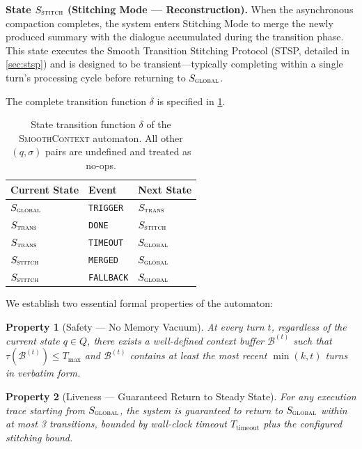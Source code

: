 \documentclass[10pt,twocolumn]{article}
\newtheorem{property}{Property}
\newcommand{\sys}{\textsc{SmoothContext}}
\newcommand{\Dtok}{\tau}
\newcommand{\Tmax}{T_{\max}}
\begin{document}
\textbf{State $S_{\textsc{stitch}}$ (Stitching Mode --- Reconstruction).} When the asynchronous compaction completes, the system enters Stitching Mode to merge the newly produced summary with the dialogue accumulated during the transition phase. This state executes the Smooth Transition Stitching Protocol (STSP, detailed in \cref{sec:stsp}) and is designed to be transient---typically completing within a single turn's processing cycle before returning to $S_{\textsc{global}}$.

The complete transition function $\delta$ is specified in \cref{tab:transitions}.

\begin{table}[h]
\centering
\caption{State transition function $\delta$ of the \sys{} automaton. All other $(q, \sigma)$ pairs are undefined and treated as no-ops.}
\label{tab:transitions}
\small
\begin{tabular}{@{}lll@{}}
\toprule
\textbf{Current State} & \textbf{Event} & \textbf{Next State} \\
\midrule
$S_{\textsc{global}}$ & \texttt{TRIGGER} & $S_{\textsc{trans}}$ \\
$S_{\textsc{trans}}$ & \texttt{DONE} & $S_{\textsc{stitch}}$ \\
$S_{\textsc{trans}}$ & \texttt{TIMEOUT} & $S_{\textsc{global}}$ \\
$S_{\textsc{stitch}}$ & \texttt{MERGED} & $S_{\textsc{global}}$ \\
$S_{\textsc{stitch}}$ & \texttt{FALLBACK} & $S_{\textsc{global}}$ \\
\bottomrule
\end{tabular}
\end{table}

We establish two essential formal properties of the automaton:

\begin{property}[Safety --- No Memory Vacuum]\label{prop:safety}
  At every turn $t$, regardless of the current state $q \in Q$, there exists a well-defined context buffer $\mathcal{B}^{(t)}$ such that $\Dtok(\mathcal{B}^{(t)}) \leq \Tmax$ and $\mathcal{B}^{(t)}$ contains at least the most recent $\min(k, t)$ turns in verbatim form.
\end{property}

\begin{property}[Liveness --- Guaranteed Return to Steady State]\label{prop:liveness}
  For any execution trace starting from $S_{\textsc{global}}$, the system is guaranteed to return to $S_{\textsc{global}}$ within at most 3 transitions, bounded by wall-clock timeout $T_{\mathrm{timeout}}$ plus the configured stitching bound.
\end{property}
\end{document}
